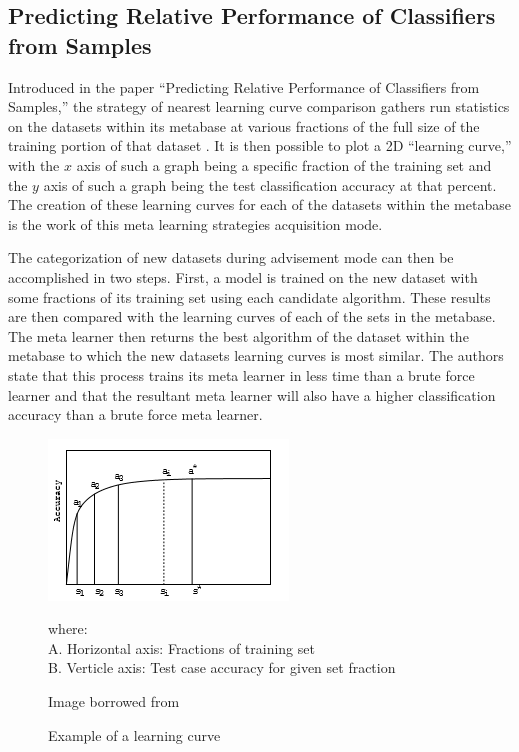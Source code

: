 \subsection{Predicting Relative Performance of Classifiers from Samples}
Introduced in the paper ``Predicting Relative Performance of Classifiers from
Samples,'' the strategy of nearest learning curve comparison gathers run
statistics on the datasets within its metabase at various fractions of the full
size of the training portion of that dataset \cite{Leite}. It is then possible to plot a 2D
``learning curve,'' with the $x$ axis of such a graph being a specific fraction
of the training set and the $y$ axis of such a graph being the test classification
accuracy at that percent. The creation of these learning curves for each of the
datasets within the metabase is the work of this meta learning strategies
acquisition mode.

The categorization of new datasets during advisement mode can then be
accomplished in two steps. First, a model is trained on the new dataset with
some fractions of its training set using each candidate algorithm. These results
are then compared with the learning curves of each of the sets in the metabase.
The meta learner then returns the best algorithm of the dataset within the
metabase to which the new datasets learning curves is most similar. The
authors state that this process trains its meta learner in less time than a
brute force learner and that the resultant meta learner will also have a higher
classification accuracy than a brute force meta learner.

\begin{figure}[h]
\includegraphics{Chapters/Images/LearningCurve/LearningCurve.PNG}
\caption{Example of a learning curve}
\centering
\begin{flushleft}
where: \\
A. Horizontal axis: Fractions of training set \\
B. Verticle axis: Test case accuracy for given set fraction \\
\end{flushleft}
Image borrowed from \cite{Leite}
\end{figure}
